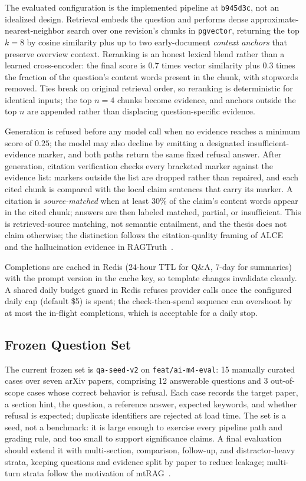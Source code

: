 The evaluated configuration is the implemented pipeline at \texttt{b945d3c}, not an idealized design.
Retrieval embeds the question and performs dense approximate-nearest-neighbor search over one revision's chunks in \texttt{pgvector}, returning the top \(k=8\) by cosine similarity plus up to two early-document \emph{context anchors} that preserve overview context.
Reranking is an honest lexical blend rather than a learned cross-encoder: the final score is \(0.7\) times vector similarity plus \(0.3\) times the fraction of the question's content words present in the chunk, with stopwords removed.
Ties break on original retrieval order, so reranking is deterministic for identical inputs; the top \(n=4\) chunks become evidence, and anchors outside the top \(n\) are appended rather than displacing question-specific evidence.

Generation is refused before any model call when no evidence reaches a minimum score of \(0.25\); the model may also decline by emitting a designated insufficient-evidence marker, and both paths return the same fixed refusal answer.
After generation, citation verification checks every bracketed marker against the evidence list: markers outside the list are dropped rather than repaired, and each cited chunk is compared with the local claim sentences that carry its marker.
A citation is \emph{source-matched} when at least \(30\%\) of the claim's content words appear in the cited chunk; answers are then labeled matched, partial, or insufficient.
This is retrieved-source matching, not semantic entailment, and the thesis does not claim otherwise; the distinction follows the citation-quality framing of ALCE~\cite{gao2023alce} and the hallucination evidence in RAGTruth~\cite{niu2024ragtruth}.

Completions are cached in Redis (24-hour TTL for Q\&A, 7-day for summaries) with the prompt version in the cache key, so template changes invalidate cleanly.
A shared daily budget guard in Redis refuses provider calls once the configured daily cap (default \$5) is spent; the check-then-spend sequence can overshoot by at most the in-flight completions, which is acceptable for a daily stop.

\subsection{Frozen Question Set}

The current frozen set is \texttt{qa-seed-v2} on \texttt{feat/ai-m4-eval}: 15 manually curated cases over seven arXiv papers, comprising 12 answerable questions and 3 out-of-scope cases whose correct behavior is refusal.
Each case records the target paper, a section hint, the question, a reference answer, expected keywords, and whether refusal is expected; duplicate identifiers are rejected at load time.
The set is a seed, not a benchmark: it is large enough to exercise every pipeline path and grading rule, and too small to support significance claims.
A final evaluation should extend it with multi-section, comparison, follow-up, and distractor-heavy strata, keeping questions and evidence split by paper to reduce leakage; multi-turn strata follow the motivation of mtRAG~\cite{katsis2025mtrag}.


